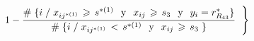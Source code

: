 \documentclass[
  11pt,
  a4paper,
]{article}
\begin{document}
\begin{gather*}
1 -  \dfrac{\# \hspace{0.1 cm}\lbrace i \hspace{0.1 cm}/\hspace{0.1 cm}  x_{ij^{*(1)}} \hspace{0.05cm}   \geqslant \hspace{0.05cm} s^{*(1)} \hspace{0.25 cm}\text{y}\hspace{0.25 cm} x_{ij} \hspace{0.05cm}  \geqslant \hspace{0.05cm} s_3 \hspace{0.25 cm}\text{y}\hspace{0.25 cm} y_i = r^*_{R_{43}} \rbrace}{\# \hspace{0.1 cm}\lbrace i \hspace{0.1 cm} / \hspace{0.1 cm}  x_{ij^{*(1)}} \hspace{0.05cm}   < \hspace{0.05cm} s^{*(1)} \hspace{0.25 cm}\text{y}\hspace{0.25 cm} x_{ij} \hspace{0.05cm}   \geqslant \hspace{0.05cm} s_3  \hspace{0.1 cm} \rbrace }  \hspace{0.2cm} \Biggl\}

\end{gather*}
\end{document}
